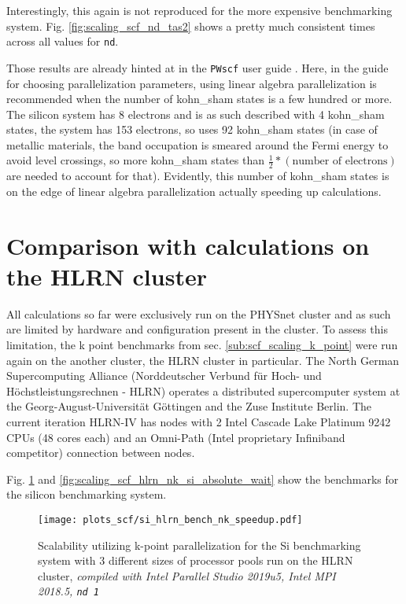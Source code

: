 \documentclass[main.tex]{subfiles}
\begin{document}
Interestingly, this again is not reproduced for the more expensive \TaS benchmarking system.
Fig. \ref{fig:scaling_scf_nd_tas2} shows a pretty much consistent times across all values for \texttt{nd}.

Those results are already hinted at in the \texttt{PWscf} user guide \cite{noauthor_pwscf_nodate}.
Here, in the guide for choosing parallelization parameters, using linear algebra parallelization is recommended when the number of \acrshort{kohn_sham} states is a few hundred or more.
The silicon system has 8 electrons and is as such described with 4 \gls{kohn_sham} states, the \TaS system has 153 electrons, so \QE uses 92 \gls{kohn_sham} states (in case of metallic materials, the band occupation is smeared around the Fermi energy to avoid level crossings, so more \gls{kohn_sham} states than \(\frac{1}{2} * (\textrm{number of electrons})\) are needed to account for that).
Evidently, this number of \acrshort{kohn_sham} states is on the edge of linear algebra parallelization actually speeding up calculations.

\section{Comparison with calculations on the HLRN cluster}

All calculations so far were exclusively run on the PHYSnet cluster and as such are limited by hardware and configuration present in the cluster.
To assess this limitation, the k point benchmarks from sec. \ref{sub:scf_scaling_k_point} were run again on the another cluster, the HLRN cluster in particular.
The North German Supercomputing Alliance (Norddeutscher Verbund für Hoch- und Höchstleistungsrechnen - HLRN) operates a distributed supercomputer system at the Georg-August-Universität Göttingen and the Zuse Institute Berlin.
The current iteration HLRN-IV has nodes with 2 Intel Cascade Lake Platinum 9242 CPUs (48 cores each) and an Omni-Path (Intel proprietary Infiniband competitor) connection between nodes.

Fig. \ref{fig:scaling_scf_hlrn_nk_si_speedup} and \ref{fig:scaling_scf_hlrn_nk_si_absolute_wait} show the benchmarks for the silicon benchmarking system.

\begin{figure}[ht!]
\centering
\texttt{[image: plots\_scf/si\_hlrn\_bench\_nk\_speedup.pdf]}
\caption{Scalability utilizing k-point parallelization for the Si benchmarking system with 3 different sizes of processor pools run on the HLRN cluster, \emph{\QE compiled with Intel Parallel Studio 2019u5, Intel MPI 2018.5, \texttt{nd 1}}}
\label{fig:scaling_scf_hlrn_nk_si_speedup}
\end{figure}
\end{document}
